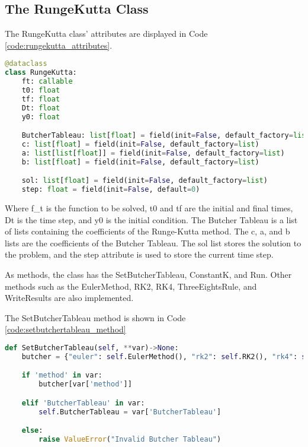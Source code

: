 \subsection{The RungeKutta Class}\label{subsec:rungekutta_class}
The RungeKutta class' attributes are displayed in Code \ref{code:rungekutta_attributes}. 
\begin{lstlisting}[caption={Attributes of the RungeKutta class},label={code:rungekutta_attributes},language=python]
@dataclass
class RungeKutta:
    ft: callable
    t0: float
    tf: float
    Dt: float
    y0: float

    ButcherTableau: list[float] = field(init=False, default_factory=list)
    c: list[float] = field(init=False, default_factory=list)
    a: list[list[float]] = field(init=False, default_factory=list)
    b: list[float] = field(init=False, default_factory=list)

    sol: list[float] = field(init=False, default_factory=list)
    step: float = field(init=False, default=0)
\end{lstlisting}

Where f\_t is the function to be solved, t0 and tf are the initial and final times, Dt is the time step, and y0 is the initial condition. The Butcher Tableau is a list of lists containing the coefficients of the Runge-Kutta method. The c, a, and b lists are the coefficients of the Butcher Tableau. The sol list stores the solution to the problem, and the step attribute is used to store the current time step.

As methods, the class has the SetButcherTableau, ConstantK, and Run. Other methods such as the EulerMethod, RK2, RK4, ThreeEightsRule, and WriteResults are also implemented. 

The SetButcherTableau method is shown in Code \ref{code:setbutchertableau_method}
\begin{lstlisting}[caption={SetButcherTableau method},label={code:setbutchertableau_method},language=python]
def SetButcherTableau(self, **var)->None:
    butcher = {"euler": self.EulerMethod(), "rk2": self.RK2(), "rk4": self.RK4(), "ThreeEights": self.ThreeEighthRule()}

    if 'method' in var:
        butcher[var['method']]

    elif 'ButcherTableau' in var:
        self.ButcherTableau = var['ButcherTableau']

    else: 
        raise ValueError("Invalid Butcher Tableau")
\end{lstlisting}

